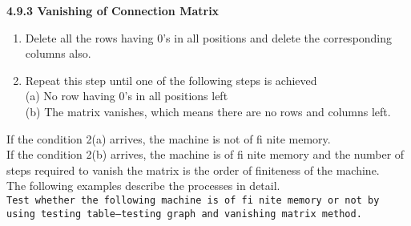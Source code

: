 \documentclass[9pt]{beamer}
\begin{document}
\begin{frame}
\large{
\textbf{4.9.3 Vanishing of Connection Matrix}\\
}

\vspace*{0.2cm}
\small{
\begin{enumerate}
  \item Delete all the rows having 0’s in all positions and delete the corresponding columns also.\\
  \item Repeat this step until one of the following steps is achieved\\
(a) No row having 0’s in all positions left\\
(b) The matrix vanishes, which means there are no rows and columns left.\\
\end{enumerate}

\vspace*{0.2cm}
\hspace*{0.5cm} If the condition 2(a) arrives, the machine is not of fi nite memory.\\
\hspace*{0.5cm} If the condition 2(b) arrives, the machine is of fi nite memory and the number of steps required to
vanish the matrix is the order of finiteness of the machine.\\
\hspace*{0.5cm} The following examples describe the processes in detail.\\

\vspace*{0.2cm}
\hspace*{0.1cm} \texttt{Test whether the following machine is of fi nite memory or not by using testing
table–testing graph and vanishing matrix method.}\\
}

\end{frame}
\end{document}
